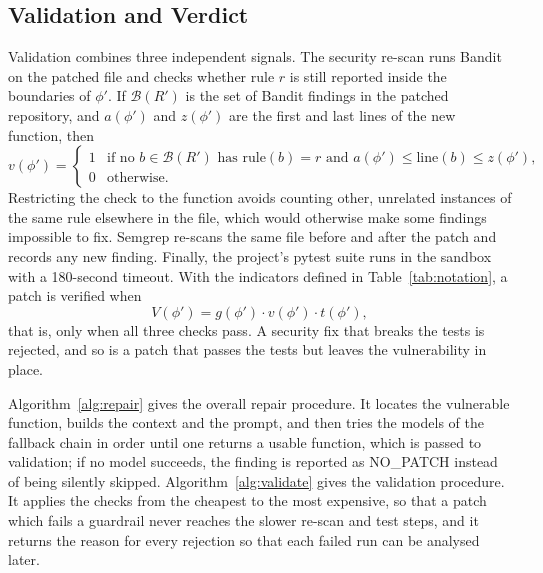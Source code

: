 \documentclass[12pt,onecolumn,draftclsnofoot]{IEEEtran}
\begin{document}
\subsection{Validation and Verdict}
Validation combines three independent signals. The security re-scan runs Bandit on the patched file and checks whether rule $r$ is still reported inside the boundaries of $\phi'$. If $\mathcal{B}(R')$ is the set of Bandit findings in the patched repository, and $a(\phi')$ and $z(\phi')$ are the first and last lines of the new function, then
\begin{equation}
v(\phi') = \begin{cases} 1 & \text{if no } b \in \mathcal{B}(R') \text{ has } \mathrm{rule}(b)=r \text{ and } a(\phi') \le \mathrm{line}(b) \le z(\phi'),\\ 0 & \text{otherwise.} \end{cases}
\label{eq:rescan}
\end{equation}
Restricting the check to the function avoids counting other, unrelated instances of the same rule elsewhere in the file, which would otherwise make some findings impossible to fix. Semgrep re-scans the same file before and after the patch and records any new finding. Finally, the project's pytest suite runs in the sandbox with a 180-second timeout. With the indicators defined in Table~\ref{tab:notation}, a patch is verified when
\begin{equation}
V(\phi') = g(\phi')\cdot v(\phi')\cdot t(\phi'),
\label{eq:verified}
\end{equation}
that is, only when all three checks pass. A security fix that breaks the tests is rejected, and so is a patch that passes the tests but leaves the vulnerability in place.

Algorithm~\ref{alg:repair} gives the overall repair procedure. It locates the vulnerable function, builds the context and the prompt, and then tries the models of the fallback chain in order until one returns a usable function, which is passed to validation; if no model succeeds, the finding is reported as NO\_PATCH instead of being silently skipped. Algorithm~\ref{alg:validate} gives the validation procedure. It applies the checks from the cheapest to the most expensive, so that a patch which fails a guardrail never reaches the slower re-scan and test steps, and it returns the reason for every rejection so that each failed run can be analysed later.
\end{document}
